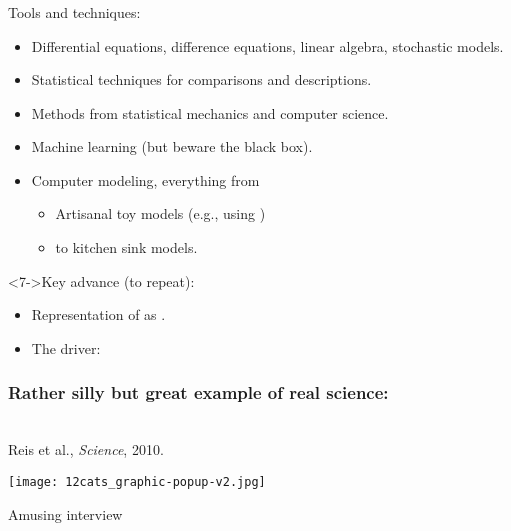 \begin{frame}
  \frametitle{}

  \begin{block}{Tools and techniques:}
    \begin{itemize}
    \item<2-> 
      Differential equations, difference equations, linear algebra,
      stochastic models.
    \item<3-> 
      Statistical techniques for comparisons and descriptions.
    \item<4-> 
      Methods from statistical mechanics and computer science.
    \item<5-> 
      Machine learning (but beware the black box).
    \item<6-> 
      Computer modeling, everything from
      \begin{itemize}
      \item 
        Artisanal toy models (e.g., using )
      \item 
        to kitchen sink models.
      \end{itemize}
    \end{itemize}
  \end{block}

  \begin{block}<7->{Key advance (to repeat):}
    \begin{itemize}
    \item<7-> Representation of 
      as .
    \item<8-> The driver: 
    \end{itemize}
  \end{block}

\end{frame}

\begin{frame}
  \frametitle{Rather silly but great example of real science:}

  \\
  Reis et al., \textit{Science}, 2010.

  \medskip

  \texttt{[image: 12cats\_graphic-popup-v2.jpg]}

  Amusing interview 

\end{frame}

